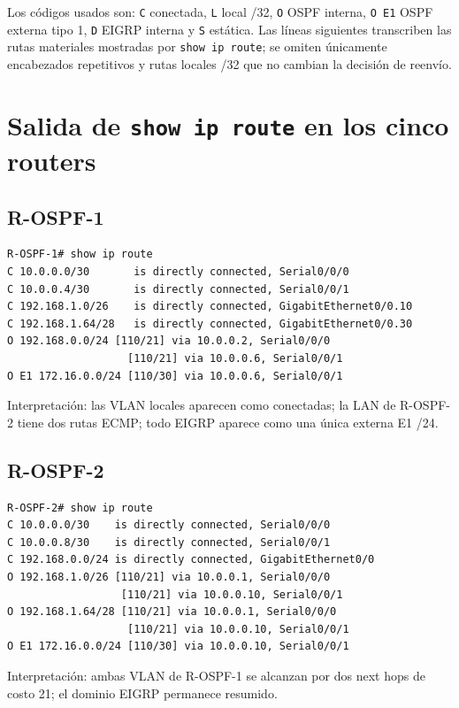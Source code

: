 \documentclass[10pt]{article}
\begin{document}
Los códigos usados son: \texttt{C} conectada, \texttt{L} local /32, \texttt{O} OSPF interna, \texttt{O E1} OSPF externa tipo 1, \texttt{D} EIGRP interna y \texttt{S} estática. Las líneas siguientes transcriben las rutas materiales mostradas por \texttt{show ip route}; se omiten únicamente encabezados repetitivos y rutas locales /32 que no cambian la decisión de reenvío.

\section{Salida de \texttt{show ip route} en los cinco routers}

\subsection{R-OSPF-1}
\begin{verbatim}
R-OSPF-1# show ip route
C 10.0.0.0/30       is directly connected, Serial0/0/0
C 10.0.0.4/30       is directly connected, Serial0/0/1
C 192.168.1.0/26    is directly connected, GigabitEthernet0/0.10
C 192.168.1.64/28   is directly connected, GigabitEthernet0/0.30
O 192.168.0.0/24 [110/21] via 10.0.0.2, Serial0/0/0
                   [110/21] via 10.0.0.6, Serial0/0/1
O E1 172.16.0.0/24 [110/30] via 10.0.0.6, Serial0/0/1
\end{verbatim}
Interpretación: las VLAN locales aparecen como conectadas; la LAN de R-OSPF-2 tiene dos rutas ECMP; todo EIGRP aparece como una única externa E1 /24.

\subsection{R-OSPF-2}
\begin{verbatim}
R-OSPF-2# show ip route
C 10.0.0.0/30    is directly connected, Serial0/0/0
C 10.0.0.8/30    is directly connected, Serial0/0/1
C 192.168.0.0/24 is directly connected, GigabitEthernet0/0
O 192.168.1.0/26 [110/21] via 10.0.0.1, Serial0/0/0
                  [110/21] via 10.0.0.10, Serial0/0/1
O 192.168.1.64/28 [110/21] via 10.0.0.1, Serial0/0/0
                   [110/21] via 10.0.0.10, Serial0/0/1
O E1 172.16.0.0/24 [110/30] via 10.0.0.10, Serial0/0/1
\end{verbatim}
Interpretación: ambas VLAN de R-OSPF-1 se alcanzan por dos next hops de costo 21; el dominio EIGRP permanece resumido.
\end{document}
